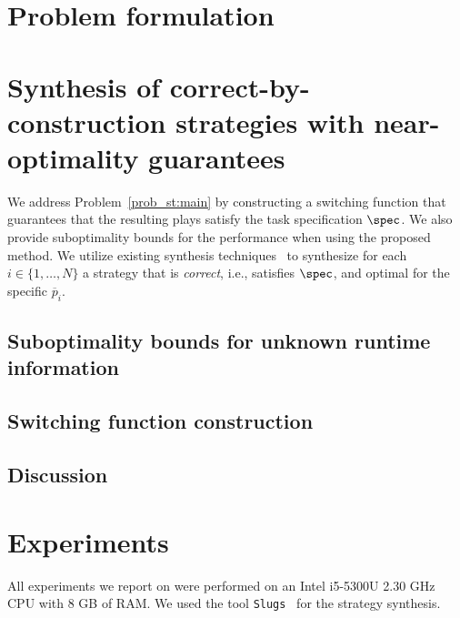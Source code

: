 


\section{Problem formulation}\label{sec:prob}




\section{Synthesis of correct-by-construction strategies with near-optimality guarantees}

We address Problem~\ref{prob_st:main} by constructing a switching function that guarantees that the resulting plays satisfy the task specification $\spec$. We also provide suboptimality bounds for the performance when using the proposed method. We utilize existing synthesis techniques~\cite{Ehlerscost} to synthesize for each $i \in \{1,\ldots,N\}$ a strategy that is \emph{correct}, i.e., satisfies $\spec$, and optimal for the specific $\overline{p}_i$.

\subsection{Suboptimality bounds for unknown runtime information}
\label{sec:generalization}


\subsection{Switching function construction}\label{sec:switching}


\subsection{Discussion}



\section{Experiments}
All experiments we report on were performed on an Intel i5-5300U 2.30 GHz CPU with 8 GB of RAM.  We used the tool \texttt{Slugs}~\cite{Ehlerslugs} for the strategy synthesis. 

